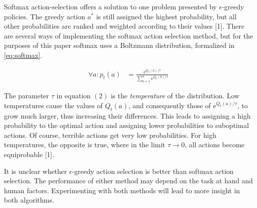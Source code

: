 \documentclass{article}
\begin{document}
Softmax action-selection offers a solution to one problem presented by $\epsilon$-greedy policies. The greedy action $a^*$ is still assigned the highest probability, but all other probabilities are ranked and weighted according to their values [1]. There are several ways of implementing the softmax action selection method, but for the purposes of this paper softmax uses a Boltzmann distribution, formalized in \ref{eq:softmax}.
\begin{mdframed}
\begin{align}
\forall a: p_t(a) &= \frac{\text{e}^{Q_t(a)/\tau}}{\sum^n_{b=1}\text{e}^{Q_t(b)/\tau}} \label{eq:softmax}
\end{align}
\end{mdframed}
The parameter $\tau$ in equation $(2)$ is the \textit{temperature} of the distribution. Low temperatures cause the values of $Q_t(a)$, and consequently those of e$^{Q_t(a)/\tau}$, to grow much larger, thus increasing their differences. This leads to assigning a high probability to the optimal action and assigning lower probabilities to suboptimal actions. Of course, terrible actions get very low probabilities. For high temperatures, the opposite is true, where in the limit $\tau\rightarrow0$, all actions become equiprobable [1].

It is unclear whether $\epsilon$-greedy action selection is better than softmax action selection. The performance of either method may depend on the task at hand and human factors. Experimenting with both methods will lead to more insight in both algorithms.
\pagebreak
\end{document}

